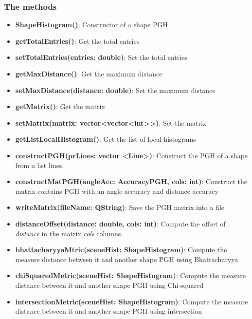 \subsubsection{The methods}
\begin{itemize}
\item\textbf{ShapeHistogram()}: Constructor of a shape PGH
\item\textbf{getTotalEntries()}: Get the total entries
\item\textbf{setTotalEntries(entries: double)}: Set the total entries
\item\textbf{getMaxDistance()}: Get the maximum distance
\item\textbf{setMaxDistance(distance: double)}: Set the maximum distance
\item\textbf{getMatrix()}: Get the matrix
\item\textbf{setMatrix(matrix: vector\textless vector\textless int\textgreater \textgreater)}: Set the matrix
\item\textbf{getListLocalHistogram()}: Get the list of local histograms
\item\textbf{constructPGH(prLines: vector \textless Line\textgreater)}: Construct the PGH of a shape from a list lines.
\item\textbf{constructMatPGH(angleAcc: AccuracyPGH, cols: int)}: Construct the matrix contains PGH with an angle accuracy and distance accuracy
\item\textbf{writeMatrix(fileName: QString)}: Save the PGH matrix into a file
\item\textbf{distanceOffset(distance: double, cols: int)}: Compute the offset of \textit{distance} in the matrix \textit{cols} columns.
\item\textbf{bhattacharyyaMtric(sceneHist: ShapeHistogram)}: Compute the measure distance between it and another shape PGH using Bhattacharyya
\item\textbf{chiSquaredMetric(sceneHist: ShapeHistogram)}: Compute the measure distance between it and another shape PGH using Chi-squared
\item\textbf{intersectionMetric(sceneHist: ShapeHistogram)}: Compute the measure distance between it and another shape PGH using intersection
\end{itemize}
